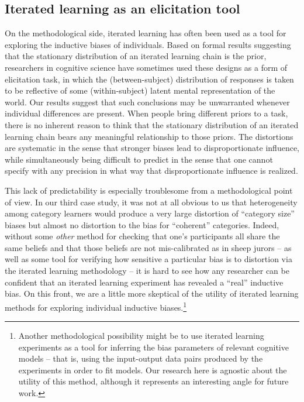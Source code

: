 \documentclass[doc]{apa6}
\begin{document}
\subsection{Iterated learning as an elicitation tool}

On the methodological side, iterated learning has often been used as a tool for exploring the inductive biases of individuals. Based on formal results suggesting that the stationary distribution of an iterated learning chain is the prior, researchers in cognitive science have sometimes used these designs as a form of elicitation task, in which the (between-subject) distribution of responses is taken to be reflective of some (within-subject) latent mental representation of the world. Our results suggest that such conclusions may be unwarranted whenever individual differences are present. When people bring different priors to a task, there is no inherent reason to think that the stationary distribution of an iterated learning chain bears any meaningful relationship to those priors. The distortions are systematic in the sense that stronger biases lead to disproportionate influence, while simultaneously being difficult to predict in the sense that one cannot specify with any precision in what way that disproportionate influence is realized.

This lack of predictability is especially troublesome from a methodological point of view. In our third case study, it was not at all obvious to us that heterogeneity among category learners would produce a very large distortion of ``category size'' biases but almost no distortion to the bias for ``coherent'' categories. Indeed, without some {\it other} method for checking that one's participants all share the same beliefs and that those beliefs are not mis-calibrated as in {\sc sheep} jurors -- as well as some tool for verifying how sensitive a particular bias is to distortion via the iterated learning methodology -- it is hard to see how any researcher can be confident that an iterated learning experiment has revealed a ``real'' inductive bias. On this front, we are a little more skeptical of the utility of iterated learning methods for exploring individual inductive biases.\footnote{Another methodological possibility might be to use iterated learning experiments as a tool for inferring the bias parameters of relevant cognitive models -- that is, using the input-output data pairs produced by the experiments in order to fit models. Our research here is agnostic about the utility of this method, although it represents an interesting angle for future work.}
\end{document}
